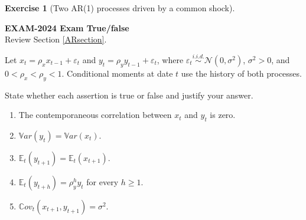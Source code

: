 \documentclass[
  11pt,
]{book}
\providecommand{\tightlist}{%
  \setlength{\itemsep}{0pt}\setlength{\parskip}{0pt}}
\theoremstyle{definition}
\theoremstyle{definition}
\theoremstyle{definition}
\newtheorem{exercise}{Exercise}[chapter]
\theoremstyle{definition}
\theoremstyle{remark}
\begin{document}
\begin{exercisebox}

\begin{exercise}[Two AR(1) processes driven by a common shock]
\protect\hypertarget{exr:ex-exam2024-shared-ar1}{}\label{exr:ex-exam2024-shared-ar1}

\textbf{EXAM-2024 \textbar{} Exam \textbar{} True/false}\\
Review Section \ref{ARsection}.

Let \(x_t=\rho_xx_{t-1}+\varepsilon_t\) and \(y_t=\rho_yy_{t-1}+\varepsilon_t\), where \(\varepsilon_t\overset{i.i.d.}{\sim}\mathcal N(0,\sigma^2)\), \(\sigma^2>0\), and \(0<\rho_x<\rho_y<1\). Conditional moments at date \(t\) use the history of both processes.

State whether each assertion is true or false and justify your answer.

\begin{enumerate}
\def\labelenumi{\arabic{enumi}.}
\tightlist
\item
  The contemporaneous correlation between \(x_t\) and \(y_t\) is zero.
\item
  \(\mathbb{V}ar(y_t)=\mathbb{V}ar(x_t)\).
\item
  \(\mathbb E_t(y_{t+1})=\mathbb E_t(x_{t+1})\).
\item
  \(\mathbb E_t(y_{t+h})=\rho_y^hy_t\) for every \(h\ge1\).
\item
  \(\mathbb{C}ov_t(x_{t+1},y_{t+1})=\sigma^2\).
\end{enumerate}

\end{exercise}

\end{exercisebox}

\end{document}
